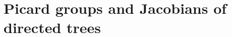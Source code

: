 \documentclass[11pt,reqno]{amsart}
\DeclareMathOperator{\Pic}{Pic}
\DeclareMathOperator{\Jac}{Jac}
\DeclareMathOperator{\Div}{Div}
\DeclareMathOperator{\Deg}{deg}
\theoremstyle{definition}
\theoremstyle{plain}
\begin{document}



\section{Picard groups and Jacobians of directed trees}\label{section: trees}
\end{document}
